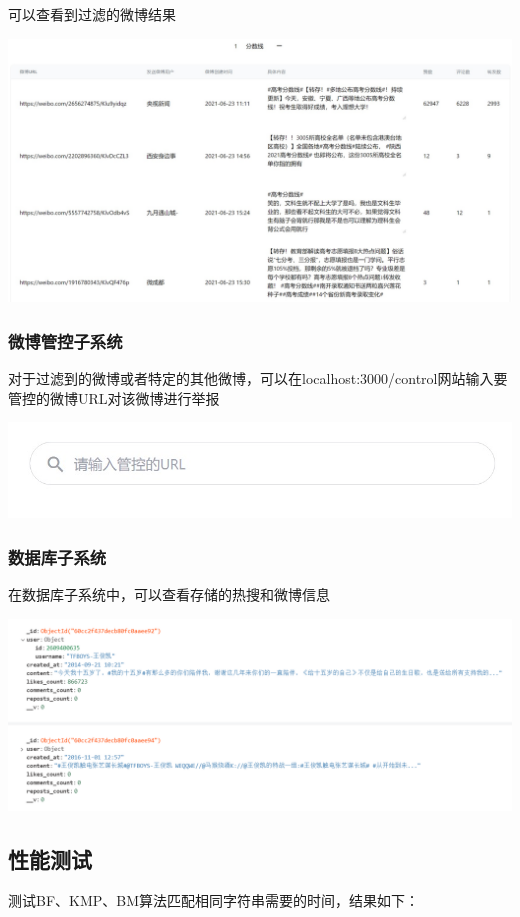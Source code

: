 \documentclass{ctexart}
\begin{document}
可以查看到过滤的微博结果

\includegraphics[width=\textwidth]{result.jpeg}

\subsubsection{微博管控子系统}
对于过滤到的微博或者特定的其他微博，可以在localhost:3000/control网站输入要管控的微博URL对该微博进行举报

\includegraphics[width=\textwidth]{control.jpeg}
\subsubsection{数据库子系统}
在数据库子系统中，可以查看存储的热搜和微博信息

\includegraphics[width=\textwidth]{database.png}
\subsection{性能测试}

测试BF、KMP、BM算法匹配相同字符串需要的时间，结果如下：
\end{document}

